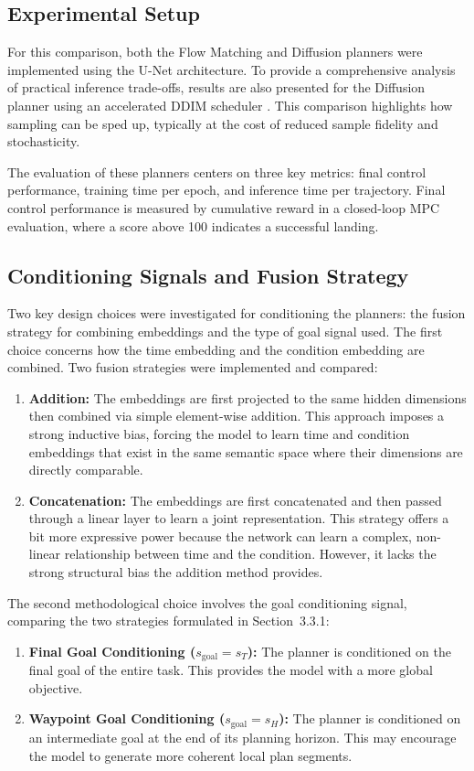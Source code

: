 \subsection{Experimental Setup}
For this comparison, both the Flow Matching and Diffusion planners were implemented using the U-Net architecture. To provide a comprehensive analysis of practical inference trade-offs, results are also presented for the Diffusion planner using an accelerated DDIM scheduler \cite{songDenoisingDiffusionImplicit2022a}. This comparison highlights how sampling can be sped up, typically at the cost of reduced sample fidelity and stochasticity.

The evaluation of these planners centers on three key metrics: final control performance, training time per epoch, and inference time per trajectory. Final control performance is measured by cumulative reward in a closed-loop MPC evaluation, where a score above 100 indicates a successful landing.
\subsection{Conditioning Signals and Fusion Strategy}
Two key design choices were investigated for conditioning the planners: the fusion strategy for combining embeddings and the type of goal signal used. The first choice concerns how the time embedding and the condition embedding are combined. Two fusion strategies were implemented and compared:

\begin{enumerate}
    \item \textbf{Addition:} The embeddings are first projected to the same hidden dimensions then combined via simple element-wise addition. This approach imposes a strong inductive bias, forcing the model to learn time and condition embeddings that exist in the same semantic space where their dimensions are directly comparable.
    \item \textbf{Concatenation:} The embeddings are first concatenated and then passed through a linear layer to learn a joint representation. This strategy offers a bit more expressive power because the network can learn a complex, non-linear relationship between time and the condition. However, it lacks the strong structural bias the addition method provides.
\end{enumerate}
The second methodological choice involves the goal conditioning signal, comparing the two strategies formulated in Section~3.3.1:

\begin{enumerate}
    \item \textbf{Final Goal Conditioning ($s_{\text{goal}} = s_T$):} The planner is conditioned on the final goal of the entire task. This provides the model with a more global objective.
    \item \textbf{Waypoint Goal Conditioning ($s_{\text{goal}} = s_H$):} The planner is conditioned on an intermediate goal at the end of its planning horizon. This may encourage the model to generate more coherent local plan segments.
\end{enumerate}

